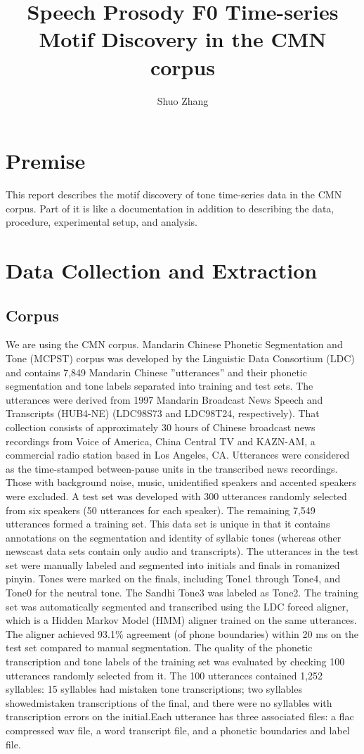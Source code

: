 \documentclass[11pt]{article}
\title{Speech Prosody F0 Time-series Motif Discovery in the
CMN corpus}
\author{Shuo Zhang}
\affil{LING/COSC, Georgetown University\\Music Technology Group, Universitat Pompeu Fabra}
\date{ }
\begin{document}
\maketitle







\section{Premise}
This report describes the motif discovery of tone time-series data in the CMN corpus. Part of it is like a documentation in addition to describing the data, procedure, experimental setup, and analysis. 

\section{Data Collection and Extraction}
\subsection{Corpus}
We are using the CMN corpus. Mandarin Chinese Phonetic Segmentation and Tone (MCPST) corpus
was developed by the Linguistic Data Consortium (LDC) and contains 7,849 Mandarin Chinese ”utterances” and their phonetic segmentation and tone labels separated into training and test sets. The utterances were derived from 1997 Mandarin Broadcast News Speech and Transcripts (HUB4-NE) (LDC98S73 and LDC98T24, respectively). That collection consists of approximately 30 hours of Chinese broadcast news recordings from Voice of America, China Central TV and KAZN-AM, a commercial radio station based in Los Angeles, CA. Utterances were considered as the time-stamped between-pause units in the
transcribed news recordings. Those with background noise, music, unidentified speakers and accented speakers were excluded. A test set was developed with 300 utterances randomly selected from six speakers (50 utterances for each speaker). The remaining 7,549 utterances formed a training set. This data set is unique in that it contains annotations on the segmentation and
identity of syllabic tones (whereas other newscast data sets contain only audio and transcripts). The utterances in the test set were manually labeled and segmented into initials and finals in romanized pinyin. Tones were marked on the finals, including Tone1 through Tone4, and Tone0 for the neutral tone. The Sandhi Tone3 was labeled as Tone2. The training set was automatically segmented and transcribed using the LDC forced aligner, which is a Hidden Markov Model (HMM) aligner trained on the same utterances. The aligner achieved 93.1\% agreement (of phone boundaries) within 20 ms on the test set compared to manual segmentation. The quality of the phonetic transcription and tone labels of the training set was evaluated by checking 100 utterances randomly selected from it. The 100 utterances contained 1,252 syllables: 15 syllables had mistaken tone transcriptions; two syllables showedmistaken transcriptions of the final, and there were no syllables with transcription errors on the initial.Each utterance has three associated files: a flac compressed wav file, a word transcript file, and a phonetic boundaries and label file.
\end{document}
